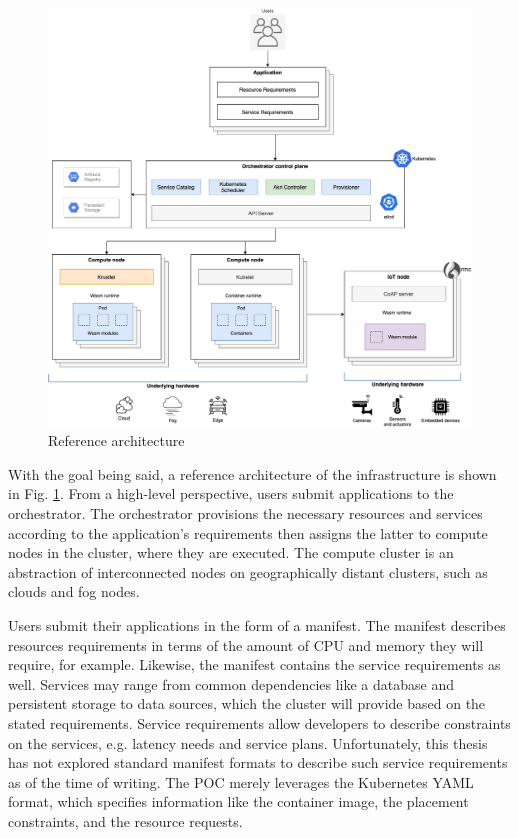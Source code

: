 \begin{figure}[h]
\centering
\includegraphics[width=\columnwidth]{figures/architecture}
\caption{Reference architecture \label{fig:architecture}}
\end{figure}

With the goal being said, a reference architecture of the infrastructure is shown in Fig. \ref{fig:architecture}. From a high-level perspective, users submit applications to the orchestrator. The orchestrator provisions the necessary resources and services according to the application's requirements then assigns the latter to compute nodes in the cluster, where they are executed. The compute cluster is an abstraction of interconnected nodes on geographically distant clusters, such as clouds and fog nodes.

Users submit their applications in the form of a manifest. The manifest describes resources requirements in terms of the amount of CPU and memory they will require, for example. Likewise, the manifest contains the service requirements as well. Services may range from common dependencies like a database and persistent storage to data sources, which the cluster will provide based on the stated requirements. Service requirements allow developers to describe constraints on the services, e.g. latency needs and service plans. Unfortunately, this thesis has not explored standard manifest formats to describe such service requirements as of the time of writing. The POC merely leverages the Kubernetes YAML format, which specifies information like the container image, the placement constraints, and the resource requests.

